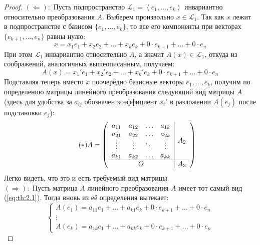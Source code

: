 \documentclass[11pt]{article}
\begin{document}
\begin{proof}
    $(\Longleftarrow):$ Пусть подпространство $\mathcal{L}_1 = \left\langle e_1, \ldots, e_k \right\rangle$ инвариантно относительно преобразования $A$. Выберем произвольно $x \in \mathcal{L}_1$. Так как $x$ лежит в подпространстве с базисом $\{e_1, \ldots, e_k\}$, то все его компоненты при векторах $\{e_{k + 1}, \ldots, e_n\}$ равны нулю:
    \[x = x_1 e_1 + x_2 e_2 + \ldots + x_k e_k + 0 \cdot e_{k + 1} + \ldots + 0 \cdot e_n\]
    При этом $\mathcal{L}_1$ инвариантно относительно $A$, а значит $A(x) \in \mathcal{L}_1$, откуда из соображений, аналогичных вышеописанным, получаем:
    \[A(x) = x_1' e_1 + x_2' e_2 + \ldots + x_k' e_k + 0 \cdot e_{k + 1} + \ldots + 0 \cdot e_n\]
    Подставляя теперь вместо $x$ поочерёдно базисные векторы $e_1, \ldots, e_k$, получим по определению матрицы линейного преобразования следующий вид матрицы $A$ (здесь для удобства за $a_{ij}$ обозначен коэффициент $x_i'$ в разложении $A(e_j)$ после подстановки $e_j$):
    \begin{equation*} \label{eq:th:2.1} \tag{$\ast$}
        A = 
        \left(\begin{array}{ c | c }
            \begin{matrix}
                a_{11} & a_{12} & \ldots & a_{1k} \\
                a_{21} & a_{22} & \ldots & a_{2k} \\
                \vdots & \vdots & \ddots & \vdots \\
                a_{k1} & a_{k2} & \ldots & a_{kk}
            \end{matrix} & A_2 \\
            \hline
            O & A_3
        \end{array}\right)
    \end{equation*}
    Легко видеть, что это и есть требуемый вид матрицы.
    \\
    $(\Longrightarrow):$ Пусть матрица $A$ линейного преобразования $A$ имеет тот самый вид (\ref{eq:th:2.1}). Тогда вновь из её определения вытекает:
    \begin{equation*}
        \begin{cases}
            A(e_1) = a_{11} e_1 + \ldots + a_{k1} e_k + 0 \cdot e_{k + 1} + \ldots + 0 \cdot e_n \\
            \vdots \\
            A(e_k) = a_{1k} e_1 + \ldots + a_{kk} e_k + 0 \cdot e_{k + 1} + \ldots + 0 \cdot e_n
        \end{cases}

\end{equation*}
\end{proof}
\end{document}
